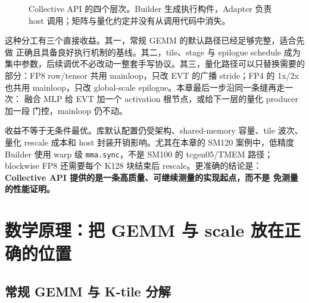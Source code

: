 \begin{figure}[H]
\centering
{}
\caption{Collective API 的四个层次。Builder 生成执行构件，Adapter 负责 host
调用；矩阵与量化约定并没有从调用代码中消失。}
\label{fig:41-api-stack}
\end{figure}

这种分工有三个直接收益。其一，常规 GEMM 的默认路径已经足够完整，适合先做
正确且具备良好执行机制的基线。其二，tile、stage 与 epilogue schedule 成为
集中参数，后续调优不必改动一整套手写协议。其三，量化路径可以只替换需要的
部分：FP8 row/tensor 共用 mainloop，只改 EVT 的广播 stride；FP4 的 1x/2x
也共用 mainloop，只改 global-scale epilogue。本章最后一步沿同一条缝再走一次：
融合 MLP 给 EVT 加一个 activation 根节点，或给下一层的量化 producer 加一段
门控，mainloop 仍不动。

收益不等于无条件最优。库默认配置仍受架构、shared-memory 容量、tile 波次、
量化 rescale 成本和 host 封装开销影响。尤其在本章的 SM120 案例中，低精度
Builder 使用 warp 级 \texttt{mma.sync}，不是 SM100 的 tcgen05/TMEM 路径；
blockwise FP8 还需要每个 K128 块结束后 rescale。更准确的结论是：
\textbf{Collective API 提供的是一条高质量、可继续测量的实现起点，而不是
免测量的性能证明。}

\section{数学原理：把 GEMM 与 scale 放在正确的位置}

\subsection{常规 GEMM 与 K-tile 分解}

